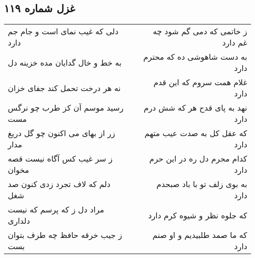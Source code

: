 \begin{center}
\section*{غزل شماره ۱۱۹}
\label{sec:sh119}
\begin{longtable}{l p{0.5cm} r}
دلی که غیب نمای است و جام جم دارد
&&
ز خاتمی که دمی گم شود چه غم دارد
\\
به خط و خال گدایان مده خزینه دل
&&
به دست شاهوشی ده که محترم دارد
\\
نه هر درخت تحمل کند جفای خزان
&&
غلام همت سروم که این قدم دارد
\\
رسید موسم آن کز طرب چو نرگس مست
&&
نهد به پای قدح هر که شش درم دارد
\\
زر از بهای می اکنون چو گل دریغ مدار
&&
که عقل کل به صدت عیب متهم دارد
\\
ز سر غیب کس آگاه نیست قصه مخوان
&&
کدام محرم دل ره در این حرم دارد
\\
دلم که لاف تجرد زدی کنون صد شغل
&&
به بوی زلف تو با باد صبحدم دارد
\\
مراد دل ز که پرسم که نیست دلداری
&&
که جلوه نظر و شیوه کرم دارد
\\
ز جیب خرقه حافظ چه طرف بتوان بست
&&
که ما صمد طلبیدیم و او صنم دارد
\\
\end{longtable}
\end{center}
